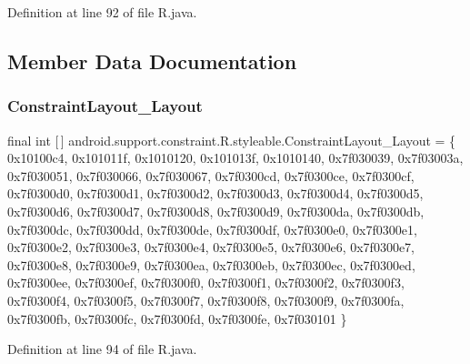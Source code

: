 Definition at line 92 of file R.\+java.


\begin{DoxyCode}{0}

\end{DoxyCode}


\subsection{Member Data Documentation}
\mbox{\label{classandroid_1_1support_1_1constraint_1_1_r_1_1styleable_a96a3757da6f0c088e10cc55aa2a6ed9f}} 
\subsubsection{\texorpdfstring{ConstraintLayout\_Layout}{ConstraintLayout\_Layout}}
{\footnotesize\ttfamily final int \mbox{[}$\,$\mbox{]} android.\+support.\+constraint.\+R.\+styleable.\+Constraint\+Layout\+\_\+\+Layout = \{ 0x10100c4, 0x101011f, 0x1010120, 0x101013f, 0x1010140, 0x7f030039, 0x7f03003a, 0x7f030051, 0x7f030066, 0x7f030067, 0x7f0300cd, 0x7f0300ce, 0x7f0300cf, 0x7f0300d0, 0x7f0300d1, 0x7f0300d2, 0x7f0300d3, 0x7f0300d4, 0x7f0300d5, 0x7f0300d6, 0x7f0300d7, 0x7f0300d8, 0x7f0300d9, 0x7f0300da, 0x7f0300db, 0x7f0300dc, 0x7f0300dd, 0x7f0300de, 0x7f0300df, 0x7f0300e0, 0x7f0300e1, 0x7f0300e2, 0x7f0300e3, 0x7f0300e4, 0x7f0300e5, 0x7f0300e6, 0x7f0300e7, 0x7f0300e8, 0x7f0300e9, 0x7f0300ea, 0x7f0300eb, 0x7f0300ec, 0x7f0300ed, 0x7f0300ee, 0x7f0300ef, 0x7f0300f0, 0x7f0300f1, 0x7f0300f2, 0x7f0300f3, 0x7f0300f4, 0x7f0300f5, 0x7f0300f7, 0x7f0300f8, 0x7f0300f9, 0x7f0300fa, 0x7f0300fb, 0x7f0300fc, 0x7f0300fd, 0x7f0300fe, 0x7f030101 \}\hspace{0.3cm}{\ttfamily [static]}}



Definition at line 94 of file R.\+java.

\mbox{\label{classandroid_1_1support_1_1constraint_1_1_r_1_1styleable_adf760fb5ee1563b2ba152b3fb0a72f81}} 
